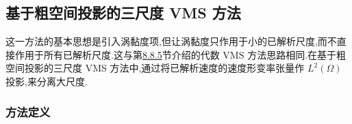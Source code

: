 \subsection{基于粗空间投影的三尺度 VMS 方法}
\label{subsec:vms-coarse-space-projection}\label{subsec:three-scale-coarse-space-projection-vms}

\begin{note}[方法的基本思想]
\label{note:vms-coarse-projection-basic-idea}
这一方法的基本思想是引入涡黏度项,但让涡黏度只作用于小的已解析尺度,而不直接作用于所有已解析尺度.这与第\hyperref[subsec:vms-orthogonal-subscales]{8.8.5}节介绍的代数 VMS 方法思路相同.在基于粗空间投影的三尺度 VMS 方法中,通过将已解析速度的速度形变率张量作 $L^2(\Omega)$ 投影,来分离大尺度.
\end{note}

\subsubsection{方法定义}
\label{subsubsec:vms-coarse-projection-definition}

